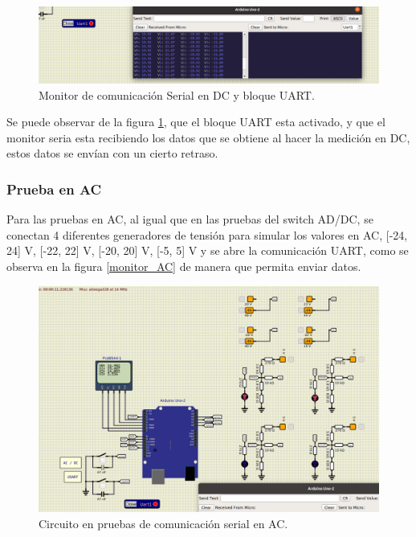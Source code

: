 \begin{figure}[H]
    \centering
    \includegraphics[width=\textwidth]{Imagenes/Comunicacion_Seria_DC.png}
    \caption{Monitor de comunicación Serial en DC y bloque UART.}
    \label{monitor_DC}
\end{figure}

Se puede observar de la figura \ref{monitor_DC}, que el bloque UART esta activado, y que el monitor seria esta recibiendo los datos que se obtiene al hacer la medición en DC, estos datos se envían con un cierto retraso.

\subsubsection{Prueba en AC}

Para las pruebas en AC, al igual que en las pruebas del switch AD/DC, se conectan 4 diferentes generadores de tensión para simular los valores en AC, [-24, 24] V, [-22, 22] V, [-20, 20] V, [-5, 5] V y se abre la comunicación UART, como se observa en la figura \ref{monitor_AC} de manera que permita enviar datos.

\begin{figure}[H]
    \centering
    \includegraphics[width=\textwidth]{Imagenes/Circuit_Comu_AC.png}
    \caption{Circuito en pruebas de comunicación serial en AC.}
    \label{SerialAC}
\end{figure}

